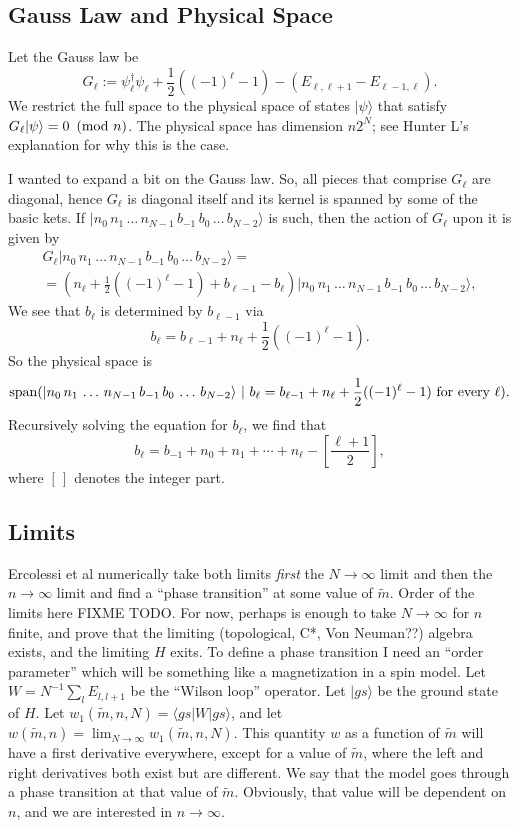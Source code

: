 	\subsection{Gauss Law and Physical Space}
	Let the Gauss law be
		\begin{equation}\label{eq:1dQED_Gauss_law}
	G_\ell := \psi_\ell^\dagger \psi_\ell + \frac{1}{2}((-1)^\ell -1)-(E_{\ell,\ell+1}-E_{\ell-1,\ell}).
	\end{equation}
	We restrict the full space to the physical space of states $|\psi\rangle$ that satisfy
	$G_\ell|\psi\rangle= 0 \ \left(\mathrm{mod}\ n\right)$. 
	The physical space has dimension $n 2^N$; see Hunter L's explanation for why this is the case.
	
	I wanted to expand a bit on the Gauss law. So, all pieces that comprise $G_\ell$ are diagonal, hence $G_\ell$ is diagonal itself and its kernel is spanned by some of the basic kets. If $|n_0\, n_1\, \ldots \, n_{N-1} \, b_{-1}\, b_0\, \ldots\, b_{N-2}\rangle$ is such, then the action of $G_\ell$ upon it is given by
	\[\begin{split}
	G_\ell|n_0\, n_1\, \ldots \, n_{N-1} \, b_{-1}\, b_0\, \ldots\, b_{N-2}\rangle =\\= (n_{\ell} + \frac{1}{2}((-1)^\ell-1) + b_{\ell-1}-b_\ell) |n_0\, n_1\, \ldots \, n_{N-1} \, b_{-1}\, b_0\, \ldots\, b_{N-2}\rangle,
	\end{split}
	\]
We see that $b_\ell$ is determined by $b_{\ell-1}$ via
	\[
	b_\ell = b_{\ell-1} + n_{\ell} + \frac{1}{2}((-1)^\ell-1).
	\]
	So the physical space is 
	\[
	\Sp ( |n_0\, n_1\, \ldots \, n_{N-1} \, b_{-1}\, b_0\, \ldots\, b_{N-2}\rangle \ | \ b_{\ell} =b_{\ell-1} + n_{\ell} + \frac{1}{2}((-1)^\ell-1) \ \text{for every} \ \ell).
	\]
	Recursively solving the equation for $b_{\ell}$, we find that
	\[
	b_{\ell} = b_{-1} + n_0 + n_1 + \cdots + n_{\ell} - \left[\frac{\ell+1}{2}\right],
	\]
	where $[ \, ]$ denotes the integer part.
	
	
	\subsection{Limits}
	Ercolessi et al \cite{ercolessi} numerically take both limits \emph{first} the $N\rightarrow\infty$ limit
   and then the $n\rightarrow\infty$ limit and find a ``phase transition'' at some value of $\tilde{m}$. Order of the limits here FIXME TODO.
	For now, perhaps is enough to take $N\rightarrow\infty$ for $n$ finite, and prove that the limiting (topological, C*, Von Neuman??)
	algebra exists, and the limiting $H$ exits.
	To define a phase transition I need an ``order parameter'' which will be something like a magnetization in a spin model.
	Let $W=N^{-1}\sum_l E_{l, l+1}$ be the ``Wilson loop'' operator. Let $|gs\rangle$ be the ground state of $H$.
	Let $w_1(\tilde{m}, n, N) = \langle gs | W |gs\rangle$, and let $w(\tilde{m}, n)=\lim_{N\rightarrow\infty} w_1(\tilde{m}, n, N)$.
	 This quantity $w$ as a function of $\tilde{m}$ will have a first derivative everywhere,
	except for a value of $\tilde{m}$, where the left and right derivatives both exist but are different.
	We say that the model goes through a phase transition at that value of $\tilde{m}$. Obviously, that value will be dependent on $n$,
	and we are interested in $n\rightarrow\infty$.
	
